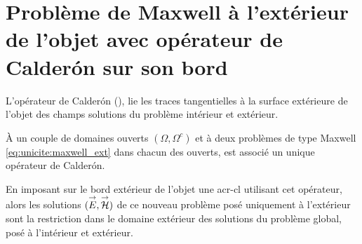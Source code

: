 \section{Problème de Maxwell à l'extérieur de l'objet avec opérateur de Calderón sur son bord}
  L'opérateur de Calderón (\cite[Def~4, p.~108]{cessenat_mathematical_1996}), lie les traces tangentielles à la surface extérieure de l'objet des champs solutions du problème intérieur et extérieur.
  
  À un couple de domaines ouverts \((\Omega, \Omega^c)\) et à deux problèmes de type Maxwell \eqref{eq:unicite:maxwell_ext} dans chacun des ouverts, est associé un unique opérateur de Calderón.

  En imposant sur le bord extérieur de l'objet une \gls{acr-cl} utilisant cet opérateur, alors les solutions \(({\overset{\rightarrow}{E}},{\overset{\rightarrow}{\mathcal{H}}})\) de ce nouveau problème posé uniquement à l'extérieur sont la restriction dans le domaine extérieur des solutions du problème global, posé à l'intérieur et extérieur.

    
    
    
